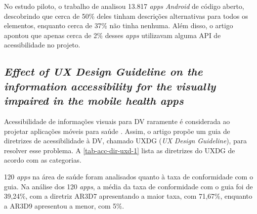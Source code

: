 No estudo piloto, o trabalho de  analisou 13.817 \emph{apps Android} de código aberto, descobrindo que cerca de 50\% deles tinham descrições alternativas para todos os elementos, enquanto cerca de 37\% não tinha nenhuma.
Além disso, o artigo apontou que apenas cerca de 2\% desses \emph{apps} utilizavam alguma API de acessibilidade no projeto.

\subsection{\emph{Effect of UX Design Guideline on the information accessibility for the visually impaired in the mobile health apps}}

Acessibilidade de informações visuais para DV raramente é considerada ao projetar aplicações móveis para saúde \cite{Kim20191103}.
Assim, o artigo propõe um guia de diretrizes de acessibilidade à DV, chamado UXDG (\emph{UX Design Guideline}), para resolver esse problema.
A \autoref{tab-acc-dir-uxd-1} lista as diretrizes do UXDG de acordo com as categorias.

120 \emph{apps} na área de saúde foram analisados quanto à taxa de conformidade com o guia.
Na análise dos 120 \emph{apps}, a média da taxa de conformidade com o guia foi de 39,24\%, com a diretriz AR3D7 apresentando
a maior taxa, com 71,67\%, enquanto a AR3D9 apresentou a menor, com 5\%.

